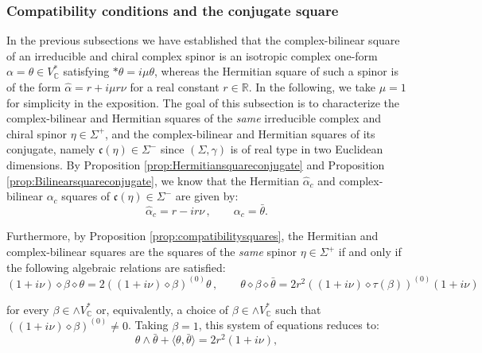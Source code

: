 \documentclass[10pt,a4paper,twoside,reqno]{amsart}
\theoremstyle{plain}
\theoremstyle{definition}
\theoremstyle{remark}
\def\C{\mathbb{C}}
\def\R{\mathbb{R}}
\def\R{\mathbb{R}}
\newcommand{\escal}[1]{\langle#1\rangle}
\def\frc{\mathfrak{F}}
\def\frc{\mathfrak{c}}
\begin{document}

\subsubsection{Compatibility conditions and the conjugate square}


In the previous subsections we have established that the complex-bilinear square of an irreducible and chiral complex spinor is an isotropic complex one-form $\alpha=\theta \in V^{\ast}_{\C}$ satisfying $\ast\theta=i\mu\theta$, whereas the Hermitian square of such a spinor is of the form $\widehat{\alpha} = r+i\mu r\nu$ for a real constant $r \in\R$. In the following, we take $\mu = 1$ for simplicity in the exposition. The goal of this subsection is to characterize the complex-bilinear and Hermitian squares of the \emph{same} irreducible complex and chiral spinor $\eta\in\Sigma^+$, and the complex-bilinear and Hermitian squares of its conjugate, namely $\frc(\eta)\in\Sigma^-$ since $(\Sigma,\gamma)$ is of real type in two Euclidean dimensions. By Proposition \ref{prop:Hermitiansquareconjugate} and Proposition \ref{prop:Bilinearsquareconjugate}, we know that the Hermitian $\widehat{\alpha}_c$ and complex-bilinear $\alpha_c$ squares of $\frc(\eta) \in \Sigma^{-}$ are given by:
\begin{equation*}
\widehat{\alpha}_c =  r - i  r\nu\, , \qquad \alpha_c = \bar{\theta}.
\end{equation*}

\noindent
Furthermore, by Proposition \ref{prop:compatibilitysquares}, the Hermitian and complex-bilinear squares are the squares of the \emph{same} spinor $\eta\in \Sigma^{+}$ if and only if the following algebraic relations are satisfied: 
\begin{equation*}  
(1 + i\nu) \diamond \beta \diamond \theta = 2 ((1 + i\nu) \diamond \beta)^{(0)} \theta \, , \qquad   \theta \diamond \beta \diamond \bar{\theta} = 2 r^2  ((1 + i\nu) \diamond  \tau(\beta))^{(0)}  (1 + i\nu)
\end{equation*}

\noindent
for every $\beta\in \wedge V^{\ast}_{\C}$ or, equivalently, a choice of $\beta\in \wedge V^{\ast}_{\C}$ such that $((1 + i\nu) \diamond \beta)^{(0)}  \neq 0$. Taking $\beta = 1$, this system of equations reduces to:
\begin{equation*}
\theta\wedge \bar{\theta} + \escal{\theta,\bar{\theta}} = 2 r^2 (1 + i \nu),
\end{equation*}
\end{document}
